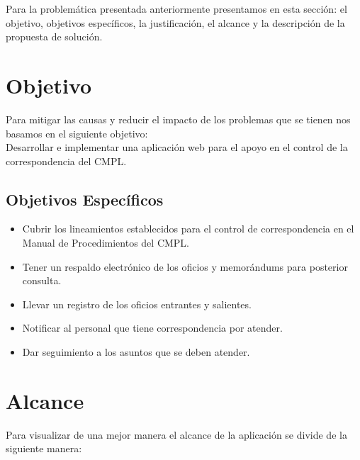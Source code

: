 Para la problemática presentada anteriormente presentamos en esta sección: el objetivo, objetivos específicos, la justificación, el alcance y la descripción de la propuesta de solución.\\

\section{Objetivo}

Para mitigar las causas y reducir el impacto de los problemas que se tienen nos basamos en el siguiente objetivo: \\

Desarrollar e implementar una aplicación web para el apoyo en el control de la correspondencia del CMPL.\\

\subsection{Objetivos Específicos}

\begin{itemize}
	\item Cubrir los lineamientos establecidos para el control de correspondencia en el Manual de Procedimientos del CMPL.
	\item Tener un respaldo electrónico de los oficios y memorándums para posterior consulta.
	\item Llevar un registro de los oficios entrantes y salientes.
	\item Notificar al personal que tiene correspondencia por atender.
	\item Dar seguimiento a los asuntos que se deben atender.
\end{itemize}


\section{Alcance}

Para visualizar de una mejor manera el alcance de la aplicación se divide de la siguiente manera: \\

